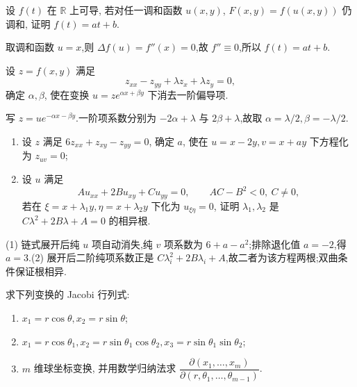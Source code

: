 \begin{example}
    设 $f(t)$ 在 $\mathbb{R}$ 上可导, 若对任一调和函数 $u(x,y)$, $F(x,y)=f(u(x,y))$ 仍调和, 证明 $f(t)=at+b$.
\end{example}
\exampleblank

\begin{solution}
    取调和函数 $u=x$,则 $\Delta f(u)=f''(x)=0$,故 $f''\equiv0$,所以 $f(t)=at+b$.
\end{solution}

\begin{example}
    设 $z=f(x,y)$ 满足
    \[
        z_{xx}-z_{yy}+\lambda z_x+\lambda z_y=0,
    \]
    确定 $\alpha,\beta$, 使在变换 $u=ze^{\alpha x+\beta y}$ 下消去一阶偏导项.
\end{example}
\exampleblank

\begin{solution}
    写 $z=u e^{-\alpha x-\beta y}$.一阶项系数分别为 $-2\alpha+\lambda$ 与 $2\beta+\lambda$,故取 $\alpha=\lambda/2,\beta=-\lambda/2$.
\end{solution}

\begin{example}[\markstar]
    \begin{enumerate}
        \item 设 $z$ 满足 $6z_{xx}+z_{xy}-z_{yy}=0$, 确定 $a$, 使在 $u=x-2y,v=x+ay$ 下方程化为 $z_{uv}=0$;
        \item 设 $u$ 满足
              \[
                  Au_{xx}+2Bu_{xy}+Cu_{yy}=0,
                  \qquad AC-B^2<0,\ C\ne0,
              \]
              若在 $\xi=x+\lambda_1y,\eta=x+\lambda_2y$ 下化为 $u_{\xi\eta}=0$, 证明 $\lambda_1,\lambda_2$ 是 $C\lambda^2+2B\lambda+A=0$ 的相异根.
    \end{enumerate}
\end{example}
\exampleblank

\begin{solution}

    (1) 链式展开后纯 $u$ 项自动消失,纯 $v$ 项系数为 $6+a-a^2$;排除退化值 $a=-2$,得 $a=3$.(2) 展开后二阶纯项系数正是 $C\lambda_i^2+2B\lambda_i+A$,故二者为该方程两根;双曲条件保证根相异.
\end{solution}

\begin{example}[\markstar]
    求下列变换的 Jacobi 行列式:
    \begin{enumerate}
        \item $x_1=r\cos\theta,x_2=r\sin\theta$;
        \item $x_1=r\cos\theta_1,x_2=r\sin\theta_1\cos\theta_2,x_3=r\sin\theta_1\sin\theta_2$;
        \item $m$ 维球坐标变换, 并用数学归纳法求 $\dfrac{\partial(x_1,\ldots,x_m)}{\partial(r,\theta_1,\ldots,\theta_{m-1})}$.
    \end{enumerate}
\end{example}
\exampleblank

